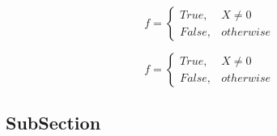 \documentclass[a4paper]{article}
\begin{document}
\begin{equation}   f =
\begin{cases} True, & X \neq 0\\
False, & otherwise
\end{cases}
\end{equation}

\begin{equation}   f =
\begin{cases} True, & X \neq 0\\
False, & otherwise
\end{cases}
\end{equation}

\subsection{SubSection}
\end{document}
